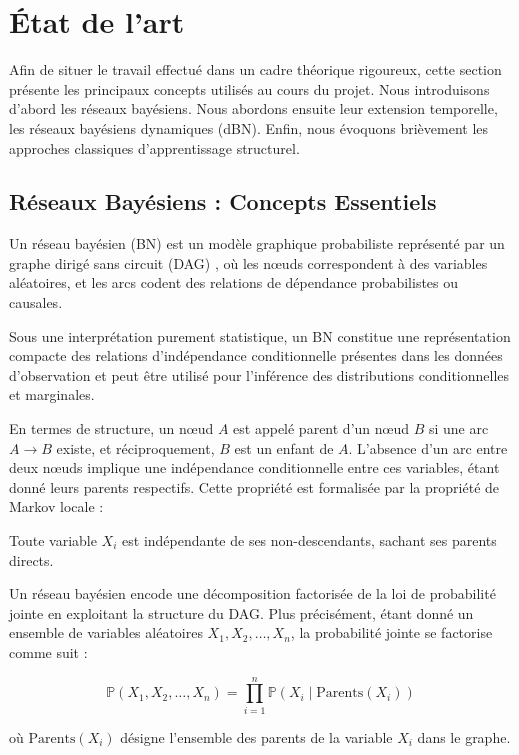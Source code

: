 \documentclass{article}
\begin{document}
\section{État de l'art}

Afin de situer le travail effectué dans un cadre théorique rigoureux, cette section présente les principaux concepts
utilisés au cours du projet. Nous introduisons d'abord les réseaux bayésiens. Nous abordons ensuite leur extension
temporelle, les réseaux bayésiens dynamiques (dBN). Enfin, nous évoquons brièvement les approches classiques
d'apprentissage structurel.

\subsection{Réseaux Bayésiens : Concepts Essentiels}


Un réseau bayésien (BN) est un modèle graphique probabiliste représenté par un graphe dirigé sans circuit
(DAG) \cite{mihajlovic2001dynamic}, où les nœuds correspondent à des variables aléatoires, et les arcs codent
des relations de dépendance probabilistes ou causales.

Sous une interprétation purement statistique, un BN constitue une représentation compacte des relations
d'indépendance conditionnelle présentes dans les données d'observation et peut être utilisé pour l'inférence des
distributions conditionnelles et marginales.

En termes de structure, un nœud $A$ est appelé parent d'un nœud $B$ si une arc $A \to B$ existe, et réciproquement,
$B$ est un enfant de $A$. L'absence d'un arc entre deux nœuds implique une indépendance conditionnelle entre ces
variables, étant donné leurs parents respectifs. Cette propriété est formalisée par la propriété de Markov locale :

\begin{center}
    Toute variable $X_i$ est indépendante de ses non-descendants, sachant ses parents directs.
\end{center}

Un réseau bayésien encode une décomposition factorisée de la loi de probabilité jointe en exploitant la structure
du DAG. Plus précisément, étant donné un ensemble de variables aléatoires $X_1, X_2, \dots, X_n$, la probabilité
jointe se factorise comme suit :

$$
    \mathbb{P}(X_1, X_2, \dots, X_n) = \prod_{i=1}^{n} \mathbb{P}(X_i \mid \text{Parents}(X_i))
$$

où $\text{Parents}(X_i)$ désigne l’ensemble des parents de la variable $X_i$ dans le graphe.
\end{document}
